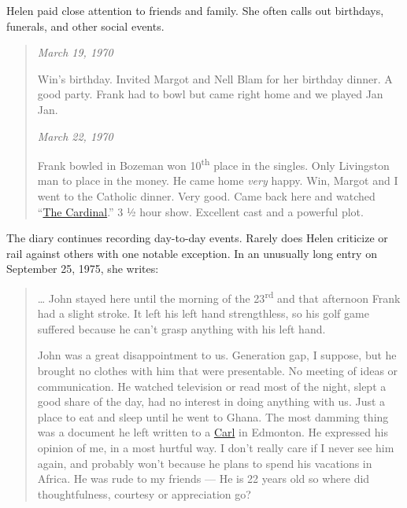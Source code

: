 Helen paid close attention to friends and family. She often calls out
birthdays, funerals, and other social events.

\begin{quote}
\emph{March 19, 1970}

Win's birthday. Invited Margot and Nell Blam for her birthday dinner. A
good party. Frank had to bowl but came right home and we played Jan Jan.

\emph{March 22, 1970}

Frank bowled in Bozeman won 10\textsuperscript{th} place in the singles.
Only Livingston man to place in the money. He came home \emph{very}
happy. Win, Margot and I went to the Catholic dinner. Very good. Came
back here and watched
``\href{https://en.wikipedia.org/wiki/The_Cardinal}{The Cardinal}.'' 3 ½
hour show. Excellent cast and a powerful plot.
\end{quote}

The diary continues recording day-to-day events. Rarely does Helen
criticize or rail against others with one notable exception. In an
unusually long entry on September 25, 1975, she writes:

\begin{quote}
\ldots{} John stayed here until the morning of the
23\textsuperscript{rd} and that afternoon Frank had a slight stroke. It
left his left hand strengthless, so his golf game suffered because he
can't grasp anything with his left hand.

John was a great disappointment to us. Generation gap, I suppose, but he
brought no clothes with him that were presentable. No meeting of ideas
or communication. He watched television or read most of the night, slept
a good share of the day, had no interest in doing anything with us. Just
a place to eat and sleep until he went to Ghana. The most damming thing
was a document he left written to a \href{https://conceptcontrol.smugmug.com/People/Inlaws-Outlaws-and-Friends/i-JcPJrrf/A}{Carl} in Edmonton. He expressed his
opinion of me, in a most hurtful way. I don't really care if I never see
him again, and probably won't because he plans to spend his vacations in
Africa. He was rude to my friends --- He is 22 years old so where
did thoughtfulness, courtesy or appreciation go?
\end{quote}

